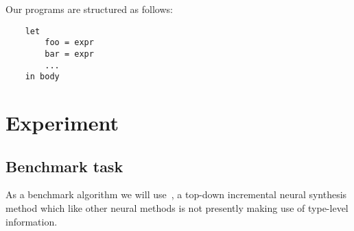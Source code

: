 \documentclass{article}
\begin{document}
Our programs are structured as follows:

\begin{verbatim}
    let
        foo = expr
        bar = expr
        ...
    in body
\end{verbatim}

\section{Experiment} %

\subsection{Benchmark task}


As a benchmark algorithm we will use~\cite{nsps}, a top-down incremental neural synthesis method which like other neural methods is not presently making use of type-level information.
\end{document}
